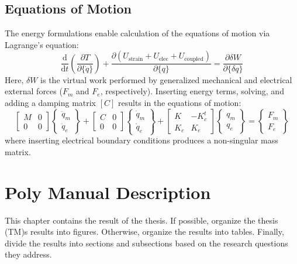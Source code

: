 \documentclass{article}
\begin{document}
\begin{body}
\subsection{Equations of Motion}
The energy formulations enable calculation of the equations of motion via Lagrange's equation:
\begin{equation}
\frac{\text{d}}{\text{d}t}\left(\frac{\partial T}{\partial \{\dot{q}\}}\right)+\frac{\partial(U_{\text{strain}}+U_{\text{elec}}+U_{\text{coupled}})}{\partial \{q\}}=\frac{\partial \delta W}{\partial \{ \delta q \}}
\end{equation}
Here, $\delta W$ is the virtual work performed by generalized mechanical and electrical external forces ($F_m$ and $F_e$, respectively). Inserting energy terms, solving, and adding a damping matrix $[C]$ results in the equations of motion:
\begin{equation}
\begin{bmatrix} M & 0 \\ 0 & 0 \end{bmatrix}
\begin{Bmatrix} \ddot{q}_m \\ \ddot{q}_e \end{Bmatrix}
+\begin{bmatrix} C & 0 \\ 0 & 0 \end{bmatrix}
\begin{Bmatrix} \dot{q}_m \\ \dot{q}_e \end{Bmatrix}
+\begin{bmatrix} K & -K_c^t \\ K_c & K_e \end{bmatrix}
\begin{Bmatrix} {q}_m \\ {q}_e \end{Bmatrix}
=\begin{Bmatrix} F_m \\ F_e \end{Bmatrix}
\end{equation}
where inserting electrical boundary conditions produces a non-singular mass matrix.






\section{Poly Manual Description}
This chapter contains the result of the thesis. If possible, organize the thesis (TM)s results into figures. Otherwise, organize the results into tables. Finally, divide the results into sections and subsections based on the research questions they address.






\end{body}
\end{document}
